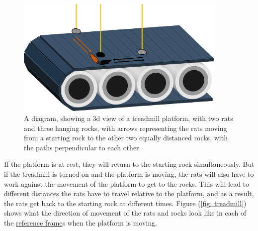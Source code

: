 \begin{figure}[H]
	\centering
	\includegraphics[width=0.9\textwidth]{images/pdf/Conveyor_belt_3d.pdf}
	\caption{A diagram, showing a 3d view of a treadmill platform, with two rats and three hanging rocks, with arrows representing the rats moving from a starting rock to the other two equally distanced rocks, with the paths perpendicular to each other.}
	\label{fig: 3d conveyor belt}
\end{figure}

If the platform is at rest, they will return to the starting rock simultaneously.
But if the treadmill is turned on and the platform is moving, the rats will also have to work against the movement of the platform to get to the rocks.
This will lead to different distances the rats have to travel relative to the platform, and as a result, the rats get back to the starting rock at different times.
Figure (\ref{fig: treadmill}) shows what the direction of movement of the rats and rocks look like in each of the \hyperlink{def-Reference-frame}{reference frame}s when the platform is moving.


